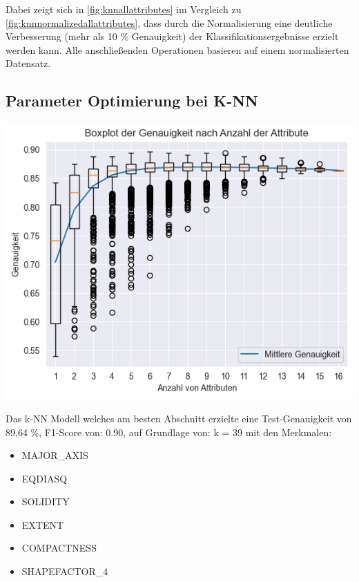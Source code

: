 Dabei zeigt sich in \autoref{fig:knnallattributes} im Vergleich zu \autoref{fig:knnnormalizedallattributes}, dass durch die Normalisierung eine deutliche Verbesserung (mehr als 10 \% Genauigkeit) der Klassifikationsergebnisse erzielt werden kann.
Alle anschließenden Operationen basieren auf einem normalisierten Datensatz.

\subsection{Parameter Optimierung bei K-NN}
{
	\centering
	\includegraphics[width=1\linewidth]{images/best_knn_of_all_combinations}
	\label{fig:bestknnofallcombinations}
}

Das k-NN Modell welches am besten Abschnitt erzielte eine Test-Genauigkeit von 89,64 \%, F1-Score von: 0.90, auf Grundlage von: \glqq{}k\grqq{} = 39 mit den Merkmalen:
\begin{itemize}[itemsep=0pt, parsep=0pt]
	\item MAJOR\_AXIS
	\item EQDIASQ
	\item SOLIDITY
	\item EXTENT
	\item COMPACTNESS
	\item SHAPEFACTOR\_4
\end{itemize}

